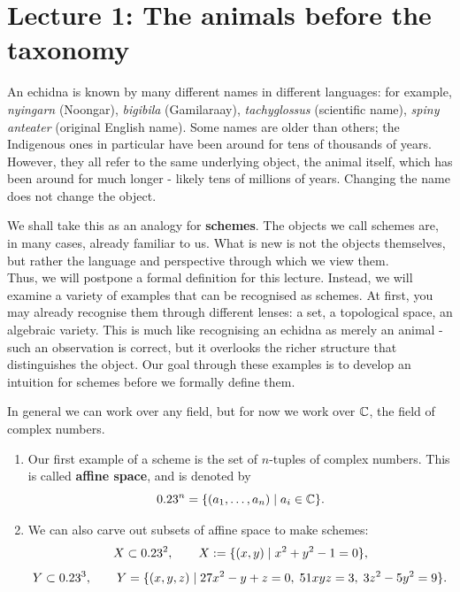 \section*{Lecture 1: The animals before the taxonomy}
\begin{remark}
    An echidna is known by many different names in different languages: for example, \textit{nyingarn} (Noongar), \textit{bigibila} (Gamilaraay), \textit{tachyglossus} (scientific name), \textit{spiny anteater} (original English name). Some names are older than others; the Indigenous ones in particular have been around for tens of thousands of years. However, they all refer to the same underlying object, the animal itself, which has been around for much longer - likely tens of millions of years. Changing the name does not change the object. 
    
    We shall take this as an analogy for \textbf{schemes}. The objects we call schemes are, in many cases, already familiar to us. What is new is not the objects themselves, but rather the language and perspective through which we view them. \\
    
    Thus, we will postpone a formal definition for this lecture. Instead, we will examine a variety of examples that can be recognised as schemes. At first, you may already recognise them through different lenses: a set, a topological space, an algebraic variety. This is much like recognising an echidna as merely an animal - such an observation is correct, but it overlooks the richer structure that distinguishes the object. Our goal through these examples is to develop an intuition for schemes before we formally define them.
\end{remark}
\begin{example}
    In general we can work over any field, but for now we work over $\mathbb{C}$, the field of complex numbers.
    \begin{enumerate}
        \item Our first example of a scheme is the set of $n$-tuples of complex numbers. This is called \textbf{affine space}, and is denoted by
        \[
        0.23^n=\{(a_1,\ldots,a_n)\mid a_i\in \mathbb{C}\}.
        \]
        \item We can also carve out subsets of affine space to make schemes:
        \[
        X\subset0.23^2, \qquad X:=\{(x,y)\mid x^2+y^2-1=0\},
        \]
        \[
        Y\subset 0.23^3, \qquad Y=\{(x,y,z)\mid 27x^2-y+z=0,\; 51xyz=3,\; 3z^2-5y^2=9\}.
        \]
    \end{enumerate}
\end{example}
